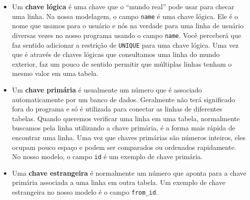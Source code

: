 \begin{itemize}


\item Um {\bf chave lógica} é uma chave que o ``mundo real'' pode usar para
  checar uma linha. Na nossa modelagem, o campo {\tt name} é uma chave lógica.
  Ele é o nome que usamos para o usuário e nós na verdade para uma linha de
  usuário diversas vezes no nosso programa usando o campo {\tt name}. Você
  perceberá que faz sentido adicionar a restrição de {\tt UNIQUE} para uma
  chave lógica. Uma vez que é através de chaves lógicas que consultamos uma
  linha do mundo exterior, faz um pouco de sentido permitir que múltiplas
  linhas tenham o mesmo valor em uma tabela.
  

\item Um {\bf chave primária} é usualmente um número que é associado
  automaticamente por um banco de dados. Geralmente não terá significado fora
  do programa e só é utilizada para conectar as linhas de diferentes tabelas.
  Quando queremos verificar uma linha em uma tabela, normalmente buscamos pela
  linha utilizando a chave primária, é a forma mais rápida de encontrar uma
  linha. Uma vez que chaves primárias são números inteiros, eles ocupam pouco
  espaço e podem ser comparados ou ordenados rapidamente. No nosso modelo, o
  campo {\tt id} é um exemplo de chave primária.
  

\item Uma {\bf chave estrangeira} é normalmente um número que aponta para a
  chave primária associada a uma linha em outra tabela. Um exemplo de chave
  estrangeira no nosso modelo é o campo \verb"from_id".
\end{itemize}

